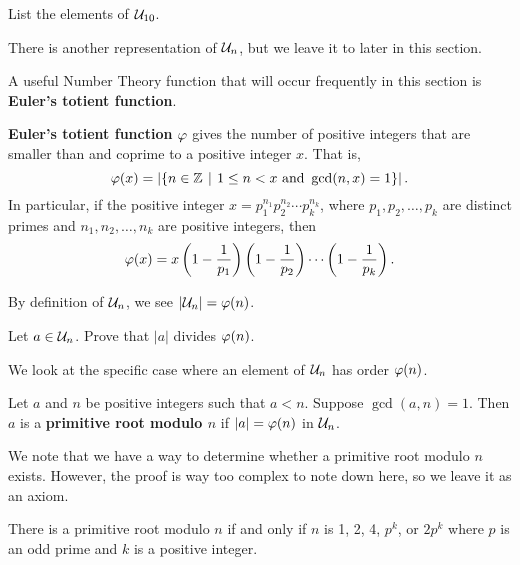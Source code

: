 \begin{exercise}
    List the elements of $\mathcal{U}_{10}$.
\end{exercise}

There is another representation of $\mathcal{U}_{n}$, but we leave it to later in this section.

A useful Number Theory function that will occur frequently in this section is \textbf{Euler's totient function}.

\begin{definition}
    \textbf{Euler's totient function} $\varphi$ gives the number of positive integers that are smaller than and coprime to a positive integer $x$. That is,
    \[
        \totient(x) = \left|\{n \in \Z \vert 1 \leq n < x \text{ and } \gcd(n, x) = 1\}\right|.
    \]
    In particular, if the positive integer $x = p_1^{n_1}p_2^{n_2}\cdots p_k^{n_k}$, where $p_1, p_2, \dots, p_k$ are distinct primes and $n_1,n_2,\dots,n_k$ are positive integers, then
    \[
        \varphi(x) = x \left(1 - \frac1{p_1}\right)\left(1 - \frac1{p_2}\right)\cdots\left(1 - \frac1{p_k}\right).
    \]
\end{definition}
\begin{remark}
    By definition of $\mathcal{U}_{n}$, we see $|\mathcal{U}_{n}| = \varphi(n)$.
\end{remark}

\begin{exercise}\label{exercise-order-of-a-divides-phi-a}
    Let $a \in \mathcal{U}_{n}$. Prove that $|a|$ divides $\varphi(n)$.
\end{exercise}

We look at the specific case where an element of $\mathcal{U}_{n}$ has order $\varphi(n)$.
\begin{definition}
    Let $a$ and $n$ be positive integers such that $a < n$. Suppose $\gcd(a, n) = 1$. Then $a$ is a \textbf{primitive root modulo $n$} if $|a| = \varphi(n)$ in $\mathcal{U}_{n}$.
\end{definition}

We note that we have a way to determine whether a primitive root modulo $n$ exists. However, the proof is way too complex to note down here, so we leave it as an axiom.
\begin{axiom}\label{axiom-primitive-root-modulo-p}
    There is a primitive root modulo $n$ if and only if $n$ is 1, 2, 4, $p^k$, or $2p^k$ where $p$ is an odd prime and $k$ is a positive integer.
\end{axiom}

